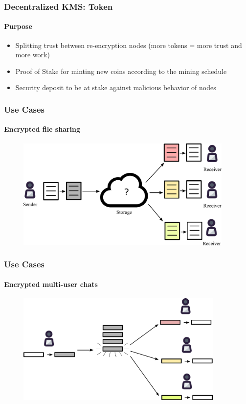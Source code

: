 \documentclass[xetex,mathsans,sans]{beamer}
\begin{document}
    \begin{frame}
        \frametitle{Decentralized KMS: Token}
        \framesubtitle{Purpose}
        \begin{itemize}
            \item Splitting trust between re-encryption nodes (more tokens = more trust and more work)
            \item Proof of Stake for minting new coins according to the mining schedule
            \item Security deposit to be at stake against malicious behavior of nodes
        \end{itemize}
    \end{frame}

    \begin{frame}
        \frametitle{Use Cases}
        \framesubtitle{Encrypted file sharing}
        \begin{figure}
            \centering
            \includegraphics[height=5.5cm]{pdf/file-sharing.pdf}
        \end{figure}
    \end{frame}

    \begin{frame}
        \frametitle{Use Cases}
        \framesubtitle{Encrypted multi-user chats}
        \begin{figure}
            \centering
            \includegraphics[height=5.5cm]{pdf/chats.pdf}
        \end{figure}
    \end{frame}
\end{document}
